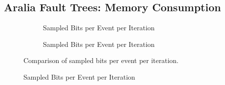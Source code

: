 \subsection{Aralia Fault Trees: Memory Consumption}


\begin{landscape}
\begin{figure}[h!]
    \centering
    \begin{subfigure}[t]{0.664\textwidth}
        \centering
        
        \caption{Sampled Bits per Event per Iteration}
        \label{fig:canopy_rel_error_plot_1}
    \end{subfigure}
    \hfill
    \begin{subfigure}[t]{0.66\textwidth}
        \centering
        
        \caption{Sampled Bits per Event per Iteration}
        \label{fig:canopy_rel_error_plot_2}
    \end{subfigure}
    \caption{Comparison of sampled bits per event per iteration.}
\end{figure}
\end{landscape}

\begin{figure}[h!]
    
    \caption{Sampled Bits per Event per Iteration}
    \label{fig: canopy_rel_error_plot}
\end{figure}